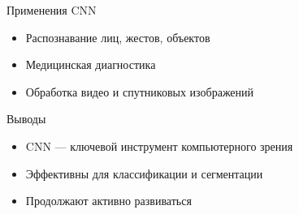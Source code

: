 \documentclass[notheorems, handout]{beamer}
\begin{document}
\begin{frame}{Применения CNN}
\begin{itemize}
    \item Распознавание лиц, жестов, объектов
    \item Медицинская диагностика
    \item Обработка видео и спутниковых изображений
\end{itemize}
\end{frame}

\begin{frame}{Выводы}
\begin{itemize}
    \item CNN — ключевой инструмент компьютерного зрения
    \item Эффективны для классификации и сегментации
    \item Продолжают активно развиваться
\end{itemize}
\end{frame}
\end{document}
